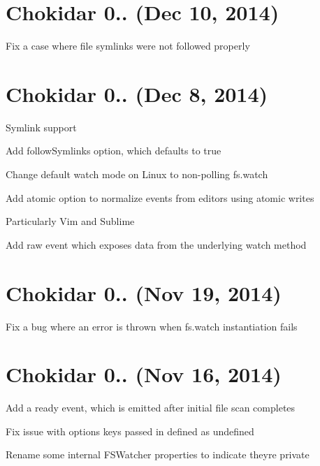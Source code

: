 \section*{Chokidar 0.. (Dec 10, 2014)}


\begin{DoxyItemize}
\item Fix a case where file symlinks were not followed properly
\end{DoxyItemize}

\section*{Chokidar 0.. (Dec 8, 2014)}


\begin{DoxyItemize}
\item Symlink support
\begin{DoxyItemize}
\item Add {\ttfamily follow\+Symlinks} option, which defaults to {\ttfamily true}
\end{DoxyItemize}
\item Change default watch mode on Linux to non-\/polling {\ttfamily fs.\+watch}
\item Add {\ttfamily atomic} option to normalize events from editors using atomic writes
\begin{DoxyItemize}
\item Particularly Vim and Sublime
\end{DoxyItemize}
\item Add {\ttfamily raw} event which exposes data from the underlying watch method
\end{DoxyItemize}

\section*{Chokidar 0.. (Nov 19, 2014)}


\begin{DoxyItemize}
\item Fix a bug where an error is thrown when {\ttfamily fs.\+watch} instantiation fails
\end{DoxyItemize}

\section*{Chokidar 0.. (Nov 16, 2014)}


\begin{DoxyItemize}
\item Add a {\ttfamily ready} event, which is emitted after initial file scan completes
\item Fix issue with options keys passed in defined as {\ttfamily undefined}
\item Rename some internal {\ttfamily F\+S\+Watcher} properties to indicate they\textquotesingle{}re private
\end{DoxyItemize}

